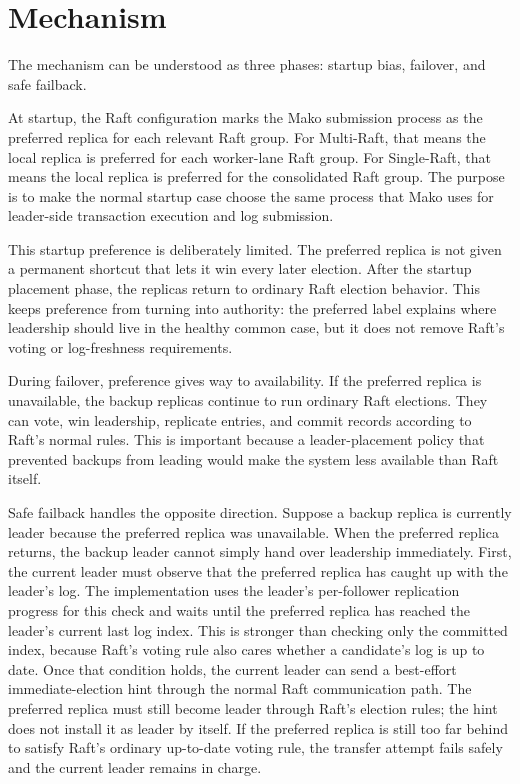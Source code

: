 \FloatBarrier

\section{Mechanism}

The mechanism can be understood as three phases: startup bias, failover, and
safe failback.

At startup, the Raft configuration marks the Mako submission process as the
preferred replica for each relevant Raft group. For Multi-Raft, that means the
local replica is preferred for each worker-lane Raft group. For Single-Raft,
that means the local replica is preferred for the consolidated Raft group. The
purpose is to make the normal startup case choose the same process that Mako
uses for leader-side transaction execution and log submission.

This startup preference is deliberately limited. The preferred replica is not
given a permanent shortcut that lets it win every later election. After the
startup placement phase, the replicas return to ordinary Raft election
behavior. This keeps preference from turning into authority: the preferred
label explains where leadership should live in the healthy common case, but it
does not remove Raft's voting or log-freshness requirements.

During failover, preference gives way to availability. If the preferred replica
is unavailable, the backup replicas continue to run ordinary Raft elections.
They can vote, win leadership, replicate entries, and commit records according
to Raft's normal rules. This is important because a leader-placement policy that
prevented backups from leading would make the system less available than Raft
itself.

Safe failback handles the opposite direction. Suppose a backup replica is
currently leader because the preferred replica was unavailable. When the
preferred replica returns, the backup leader cannot simply hand over leadership
immediately. First, the current leader must observe that the preferred replica
has caught up with the leader's log. The implementation uses the leader's
per-follower replication progress for this check and waits until the preferred
replica has reached the leader's current last log index. This is stronger than
checking only the committed index, because Raft's voting rule also cares
whether a candidate's log is up to date. Once that condition holds, the current
leader can send a best-effort immediate-election hint through the normal Raft
communication path. The preferred replica must still become leader through
Raft's election rules; the hint does not install it as leader by itself. If the
preferred replica is still too far behind to satisfy Raft's ordinary
up-to-date voting rule, the transfer attempt fails safely and the current
leader remains in charge.

